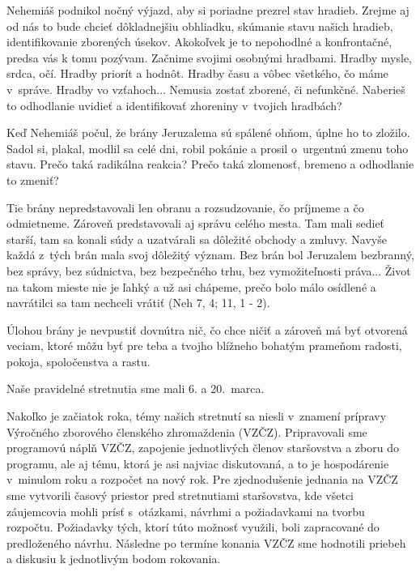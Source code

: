 Nehemiáš podnikol nočný výjazd, aby si poriadne prezrel stav hradieb. Zrejme aj od nás to bude chcieť dôkladnejšiu obhliadku, skúmanie stavu našich hradieb, identifikovanie zborených úsekov. Akokoľvek je to nepohodlné a konfrontačné, predsa vás k tomu pozývam. Začnime svojimi osobnými hradbami. Hradby mysle, srdca, očí. Hradby priorít a hodnôt. Hradby času a vôbec všetkého, čo máme v~správe. Hradby vo vzťahoch... Nemusia zostať zborené, či nefunkčné. Naberieš to odhodlanie uvidieť a identifikovať zhoreniny v~tvojich hradbách?

Keď Nehemiáš počul, že brány Jeruzalema sú spálené ohňom, úplne ho to zložilo. Sadol si, plakal, modlil sa celé dni, robil pokánie a prosil o~urgentnú zmenu toho stavu. Prečo taká radikálna reakcia? Prečo taká zlomenosť, bremeno a odhodlanie to zmeniť?

Tie brány nepredstavovali len obranu a rozsudzovanie, čo príjmeme a čo odmietneme. Zároveň predstavovali aj správu celého mesta. Tam mali sedieť starší, tam sa konali súdy a uzatvárali sa dôležité obchody a zmluvy. Navyše každá z~tých brán mala svoj dôležitý význam. Bez brán bol Jeruzalem bezbranný, bez správy, bez súdnictva, bez bezpečného trhu, bez vymožiteľnosti práva... Život na takom mieste nie je ľahký a už asi chápeme, prečo bolo málo osídlené a navrátilci sa tam nechceli vrátiť (Neh 7, 4; 11, 1 - 2).

Úlohou brány je nevpustiť dovnútra nič, čo chce ničiť a zároveň má byť otvorená veciam, ktoré môžu byť pre teba a tvojho blížneho bohatým prameňom radosti, pokoja, spoločenstva a rastu.



Naše pravidelné stretnutia sme mali 6. a 20.~marca.

Nakoľko je začiatok roka, témy našich stretnutí sa niesli v~znamení prípravy Výročného zborového členského zhromaždenia (VZČZ). Pripravovali sme programovú náplň VZČZ, zapojenie jednotlivých členov staršovstva a zboru do programu, ale aj tému, ktorá je asi najviac diskutovaná, a to je hospodárenie v~minulom roku a rozpočet na nový rok. Pre zjednodušenie jednania na VZČZ sme vytvorili časový priestor pred stretnutiami staršovstva, kde všetci záujemcovia mohli prísť s~otázkami, návrhmi a požiadavkami na tvorbu rozpočtu. Požiadavky tých, ktorí túto možnosť využili, boli zapracované do predloženého návrhu.
Následne po termíne konania VZČZ sme hodnotili priebeh a diskusiu k jednotlivým bodom rokovania.

